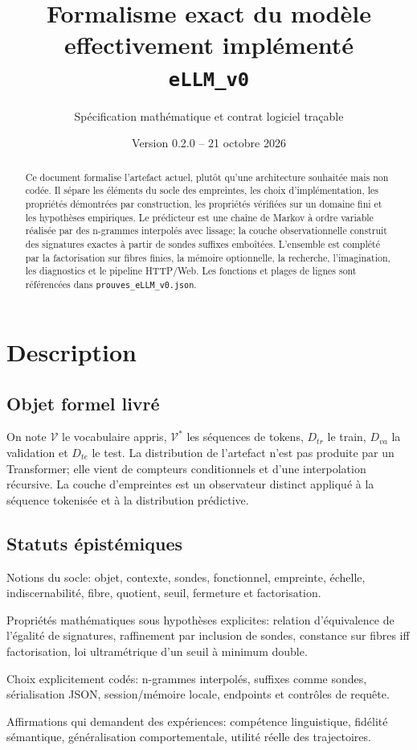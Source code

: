 \documentclass[11pt,a4paper]{article}
\title{Formalisme exact du modèle effectivement implémenté\\\texttt{eLLM\_v0}}
\author{Spécification mathématique et contrat logiciel traçable}
\date{Version 0.2.0 -- 21 octobre 2026}
\begin{document}
\maketitle
\begin{abstract}
Ce document formalise l'artefact actuel, plutôt qu'une architecture souhaitée mais non codée. Il sépare les éléments du socle des empreintes, les choix d'implémentation, les propriétés démontrées par construction, les propriétés vérifiées sur un domaine fini et les hypothèses empiriques. Le prédicteur est une chaîne de Markov à ordre variable réalisée par des n-grammes interpolés avec lissage; la couche observationnelle construit des signatures exactes à partir de sondes suffixes emboîtées. L'ensemble est complété par la factorisation sur fibres finies, la mémoire optionnelle, la recherche, l'imagination, les diagnostics et le pipeline HTTP/Web. Les fonctions et plages de lignes sont référencées dans \texttt{prouves\_eLLM\_v0.json}.
\end{abstract}
\tableofcontents
\section{Description}
\subsection{Objet formel livré}
On note $\mathcal V$ le vocabulaire appris, $\mathcal V^*$ les séquences de tokens, $D_{tr}$ le train, $D_{va}$ la validation et $D_{te}$ le test. La distribution de l'artefact n'est pas produite par un Transformer; elle vient de compteurs conditionnels et d'une interpolation récursive. La couche d'empreintes est un observateur distinct appliqué à la séquence tokenisée et à la distribution prédictive.
\subsection{Statuts épistémiques}
\begin{description}[leftmargin=3.2cm,style=nextline]
\item[BASE] Notions du socle: objet, contexte, sondes, fonctionnel, empreinte, échelle, indiscernabilité, fibre, quotient, seuil, fermeture et factorisation.
\item[DÉRIVÉ] Propriétés mathématiques sous hypothèses explicites: relation d'équivalence de l'égalité de signatures, raffinement par inclusion de sondes, constance sur fibres iff factorisation, loi ultramétrique d'un seuil à minimum double.
\item[INGÉNIERIE] Choix explicitement codés: n-grammes interpolés, suffixes comme sondes, sérialisation JSON, session/mémoire locale, endpoints et contrôles de requête.
\item[EMPIRIQUE] Affirmations qui demandent des expériences: compétence linguistique, fidélité sémantique, généralisation comportementale, utilité réelle des trajectoires.
\end{description}
\end{document}
